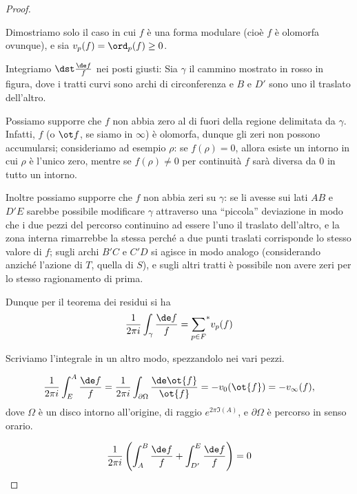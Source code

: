 \begin{proof}
	\begin{figure}
		
	\end{figure}
	Dimostriamo solo il caso in cui $f$ è una forma modulare (cioè $f$ è olomorfa ovunque), e sia $v_p(f)=\ord_p(f)\geq0$.
	
	Integriamo $\dst \frac{\de f}{f}$ nei posti giusti: Sia $\gamma$ il cammino mostrato in rosso in figura, dove i tratti curvi sono archi di circonferenza e $B$ e $D'$ sono uno il traslato dell'altro.
	
	Possiamo supporre che $f$ non abbia zero al di fuori della regione delimitata da $\gamma$.
	Infatti, $f$ (o $\ot f$, se siamo in $\infty$) è olomorfa, dunque gli zeri non possono accumularsi; consideriamo ad esempio $\rho$: se $f(\rho)=0$, allora esiste un intorno in cui $\rho$ è l'unico zero, mentre se $f(\rho)\neq0$ per continuità $f$ sarà diversa da $0$ in tutto un intorno.
	
	Inoltre possiamo supporre che $f$ non abbia zeri su $\gamma$: se li avesse sui lati $AB$ e $D'E$ sarebbe possibile modificare $\gamma$ attraverso una ``piccola'' deviazione in modo che i due pezzi del percorso continuino ad essere l'uno il traslato dell'altro, e la zona interna rimarrebbe la stessa perché a due punti traslati corrisponde lo stesso valore di $f$; sugli archi $B'C$ e $C'D$ si agisce in modo analogo (considerando anziché l'azione di $T$, quella di $S$), e sugli altri tratti è possibile non avere zeri per lo stesso ragionamento di prima.
	
	Dunque per il teorema dei residui si ha
	\begin{equation*}
		\frac{1}{2\pi i} \int_{\gamma} \frac{\de f}{f}={\sum_{p\in F}}^{*}v_p(f)
	\end{equation*}
	
	Scriviamo l'integrale in un altro modo, spezzandolo nei vari pezzi.
	
	\begin{equation*}
		\frac{1}{2\pi i}\int_E^A\frac{\de f}{f}=\frac{1}{2\pi i}\int_{\partial\Omega}\frac{\de \ot{f}}{\ot{f}}=-v_0(\ot{f})=-v_\infty(f),
	\end{equation*}
	dove $\Omega$ è un disco intorno all'origine, di raggio $e^{2\pi \Im(A)}$, e $\partial\Omega$ è percorso in senso orario.
	
	\begin{equation*}
		\frac{1}{2\pi i}\left( \int_A^B\frac{\de f}{f} + \int_{D'}^E\frac{\de f}{f} \right) =0
	\end{equation*}
	

\end{proof}
